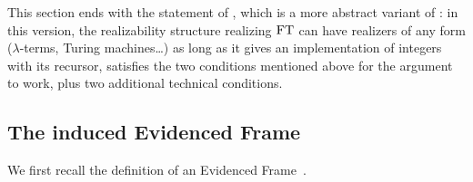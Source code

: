 \documentclass[a4paper,UKenglish,cleveref, autoref, thm-restate]{lipics-v2021}
\begin{document}
This section ends with the statement of , which is a more abstract
variant of : in this version, the realizability structure realizing $\mathrm{FT}$ can have realizers of any form ($\lambda$-terms, Turing machines\ldots) as long as it gives an implementation of integers with its recursor, satisfies the two conditions mentioned above for the argument to work,
plus two additional technical conditions.

\subsection{The induced Evidenced Frame}
\label{s:EF}



We first recall the definition of an Evidenced Frame~\cite{CohMiqTat21}.

\end{document}
